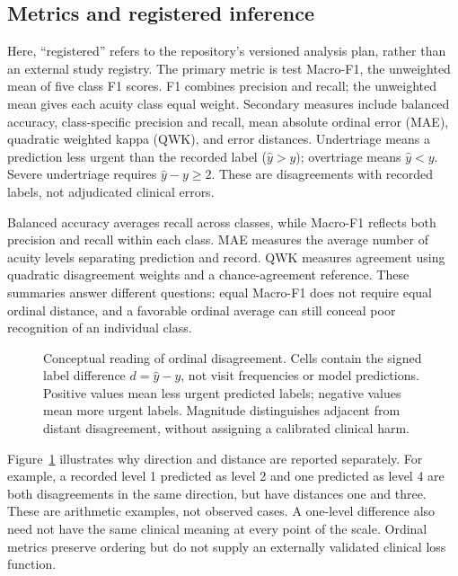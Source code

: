 \subsection{Metrics and registered inference}
Here, ``registered'' refers to the repository's versioned analysis plan,
rather than an external study registry.
The primary metric is test Macro-F1, the unweighted mean of five class F1
scores. F1 combines precision and recall; the unweighted mean gives each
acuity class equal weight. Secondary measures include balanced accuracy, class-specific precision
and recall, mean absolute ordinal error (MAE), quadratic weighted kappa (QWK),
and error distances. Undertriage means a prediction less urgent than the
recorded label ($\hat y>y$); overtriage means $\hat y<y$. Severe undertriage
requires $\hat y-y\geq2$. These are disagreements with recorded labels, not
adjudicated clinical errors.

Balanced accuracy averages recall across classes, while Macro-F1 reflects
both precision and recall within each class. MAE measures the average
number of acuity levels separating prediction and record. QWK measures
agreement using quadratic disagreement weights and a chance-agreement
reference. These summaries answer different questions: equal Macro-F1 does
not require equal ordinal distance, and a favorable ordinal average can
still conceal poor recognition of an individual class.

\begin{figure}[t]
\centering

\caption{Conceptual reading of ordinal disagreement. Cells contain the
signed label difference $d=\hat y-y$, not visit frequencies or model
predictions. Positive values mean less urgent predicted labels; negative
values mean more urgent labels. Magnitude distinguishes adjacent from
distant disagreement, without assigning a calibrated clinical harm.}
\label{fig:ordinal}
\end{figure}

Figure~\ref{fig:ordinal} illustrates why direction and distance are reported
separately. For example, a recorded level 1 predicted as level 2 and one
predicted as level 4 are both disagreements in the same direction, but
have distances one and three. These are arithmetic examples, not observed
cases. A one-level difference also need not have the same clinical meaning
at every point of the scale. Ordinal metrics preserve ordering but do not
supply an externally validated clinical loss function.

